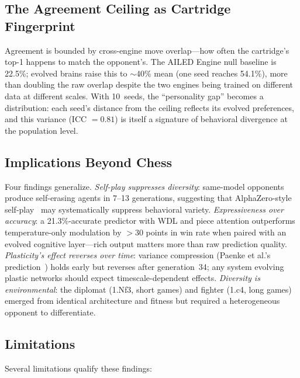 \documentclass[11pt,a4paper]{article}
\begin{document}
\subsection{The Agreement Ceiling as Cartridge Fingerprint}

Agreement is bounded by cross-engine move overlap---how often the cartridge's top-1 happens to match the opponent's.
The AILED Engine null baseline is 22.5\%; evolved brains raise this to $\sim$40\% mean (one seed reaches 54.1\%), more than doubling the raw overlap despite the two engines being trained on different data at different scales.
With 10~seeds, the ``personality gap'' becomes a distribution: each seed's distance from the ceiling reflects its evolved preferences, and this variance (ICC $= 0.81$) is itself a signature of behavioral divergence at the population level.

\subsection{Implications Beyond Chess}

Four findings generalize.
\emph{Self-play suppresses diversity}: same-model opponents produce self-erasing agents in 7--13 generations, suggesting that AlphaZero-style self-play~\citep{silver2018alphazero} may systematically suppress behavioral variety.
\emph{Expressiveness over accuracy}: a 21.3\%-accurate predictor with WDL and piece attention outperforms temperature-only modulation by $>$30 points in win rate when paired with an evolved cognitive layer---rich output matters more than raw prediction quality.
\emph{Plasticity's effect reverses over time}: variance compression (Paenke et al.'s prediction~\citep{paenke2009baldwin}) holds early but reverses after generation~34; any system evolving plastic networks should expect timescale-dependent effects.
\emph{Diversity is environmental}: the diplomat (1.Nf3, short games) and fighter (1.c4, long games) emerged from identical architecture and fitness but required a heterogeneous opponent to differentiate.

\subsection{Limitations}

Several limitations qualify these findings:
\end{document}

